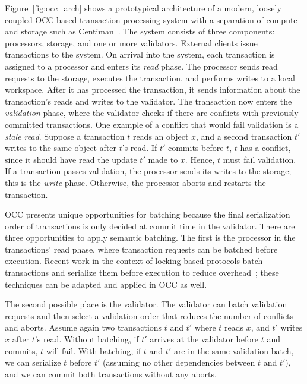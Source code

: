 Figure~\ref{fig:occ_arch} shows a prototypical architecture of a modern, loosely coupled OCC-based transaction processing system with a separation of compute and storage such as Centiman~\cite{ding2015centiman}. 
The system consists of three components: processors, storage, and one or more validators. External clients issue transactions to the system. On arrival into the system, each transaction is assigned to a processor and enters its \emph{read} phase. The processor sends read requests to the storage, executes the transaction, and performs writes to a local workspace. After it has processed the transaction, it sends information about the transaction's reads and writes to the validator. 
The transaction now enters the \emph{validation} phase, where 
the validator checks if there are conflicts with previously committed transactions. 
One example of a conflict that would fail validation is a \emph{stale read}. Suppose a transaction $t$ reads an object $x$, and a second transaction
$t'$ writes to the same object after $t$'s read. If $t'$ commits before $t$, $t$
has a conflict, since it should have read the update $t'$ made to $x$. Hence, $t$ must fail validation. 
If a transaction passes validation, the processor sends its writes to the storage; this is the \emph{write} phase. Otherwise, the processor aborts and restarts the transaction.

OCC 
presents unique opportunities for batching because the final serialization order of transactions is only decided at commit time in the validator. 
There are three opportunities to apply semantic batching. The first is the processor in
the transactions' read phase, where transaction requests can be batched before
execution. Recent work in the context of locking-based protocols batch transactions 
and serialize them before execution to reduce overhead~\cite{faleiro2014rethinking,mu2014extracting,thomson2012calvin}; 
these techniques can be adapted and applied in OCC as well.

The second possible place is the validator. The validator can batch validation requests and then select 
a validation order that reduces the number of conflicts and
aborts. Assume again two transactions $t$ and $t'$ where $t$ reads $x$,
and $t'$ writes $x$ after $t$'s read. Without batching, if $t'$ arrives at
the validator before $t$ and commits, $t$ will fail. With
batching, if $t$ and $t'$ are in the same validation batch, 
we can serialize $t$ before $t'$ (assuming no other dependencies between $t$ and $t'$), 
and we can commit both transactions without any aborts.


